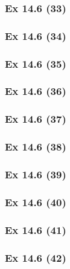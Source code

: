 \subsubsection{Ex 14.6 (33)}\label{sec:Ex_14.6.33}

\subsubsection{Ex 14.6 (34)}\label{sec:Ex_14.6.34}

\subsubsection{Ex 14.6 (35)}\label{sec:Ex_14.6.35}

\subsubsection{Ex 14.6 (36)}\label{sec:Ex_14.6.36}

\subsubsection{Ex 14.6 (37)}\label{sec:Ex_14.6.37}

\subsubsection{Ex 14.6 (38)}\label{sec:Ex_14.6.38}

\subsubsection{Ex 14.6 (39)}\label{sec:Ex_14.6.39}

\subsubsection{Ex 14.6 (40)}\label{sec:Ex_14.6.40}

\newpage		%

\subsubsection{Ex 14.6 (41)}\label{sec:Ex_14.6.41}

\subsubsection{Ex 14.6 (42)}\label{sec:Ex_14.6.42}

